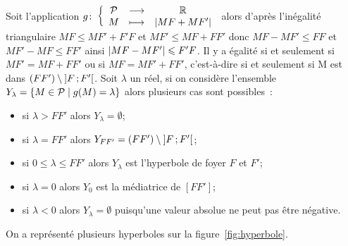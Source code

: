 Soit l'application \(g\colon \left\{\begin{array}{ccc} \mathcal{P} & \longrightarrow &\mathbb{R}\\ M & \longmapsto & \left\lvert MF+MF'\right\rvert \end{array} \right.\) alors d'après l'inégalité triangulaire \(MF \leqslant MF'+F'F\) et \(MF'\leqslant MF+FF'\) donc \(MF-MF'\leqslant FF\) et \(MF'-MF\leqslant FF'\) ainsi \(\left\lvert MF-MF'\right\rvert\leqslant F'F\). Il y a égalité si et seulement si \(MF'=MF+FF'\) ou si \(MF=MF'+FF'\), c'est-à-dire si et seulement si M est dans \((FF') \setminus \left] F \, ;  F' \right[\). Soit \(\lambda\) un réel, si on considère l'ensemble \(Y_{\lambda}=\left\{M \in \mathcal{P}\mathrel{}\middle|\mathrel{}g(M)=\lambda\right\}\) alors plusieurs cas sont possibles~:
\begin{itemize}
\item si \(\lambda>FF'\) alors \(Y_{\lambda}=\emptyset\);
\item si \(\lambda=FF'\) alors \(Y_{FF'}=(FF') \setminus \left] F \, ;  F' \right[\);
\item si \(0\leqslant\lambda\leqslant FF'\) alors \(Y_{\lambda}\) est l'hyperbole de foyer \(F\) et \(F'\);
\item si \(\lambda=0\) alors \(Y_{0}\) est la médiatrice de \([FF']\);
\item si \(\lambda<0\) alors \(Y_{\lambda}=\emptyset\) puisqu'une valeur absolue ne peut pas être négative.
\end{itemize}

On a représenté plusieurs hyperboles sur la figure~\ref{fig:hyperbole}.

